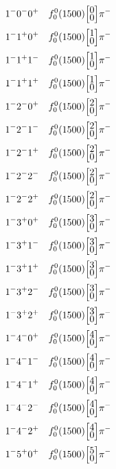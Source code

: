 \documentclass[10pt,a4paper]{article}
\def\dst{\displaystyle}
\def\vsp{\hbox{\vrule height12.5pt depth3.5pt width0pt}}
\def\ells#1#2{\Big[\hskip-5pt\vsp\begin{array}{c}\dst#1\\[-4pt]\dst#2\end{array}\vsp\hskip-5pt\Big]}
\begin{document}
\begin{align*} 
 \begin{aligned}
1^{-}0^{-}0^{+}\quad & f_0^0(1500)\ells{0}{0}\pi^-\\
1^{-}1^{+}0^{+}\quad & f_0^0(1500)\ells{1}{0}\pi^-\\
1^{-}1^{+}1^{-}\quad & f_0^0(1500)\ells{1}{0}\pi^-\\
1^{-}1^{+}1^{+}\quad & f_0^0(1500)\ells{1}{0}\pi^-\\
1^{-}2^{-}0^{+}\quad & f_0^0(1500)\ells{2}{0}\pi^-\\
1^{-}2^{-}1^{-}\quad & f_0^0(1500)\ells{2}{0}\pi^-\\
1^{-}2^{-}1^{+}\quad & f_0^0(1500)\ells{2}{0}\pi^-\\
1^{-}2^{-}2^{-}\quad & f_0^0(1500)\ells{2}{0}\pi^-\\
1^{-}2^{-}2^{+}\quad & f_0^0(1500)\ells{2}{0}\pi^-\\
1^{-}3^{+}0^{+}\quad & f_0^0(1500)\ells{3}{0}\pi^-\\
1^{-}3^{+}1^{-}\quad & f_0^0(1500)\ells{3}{0}\pi^-\\
1^{-}3^{+}1^{+}\quad & f_0^0(1500)\ells{3}{0}\pi^-\\
1^{-}3^{+}2^{-}\quad & f_0^0(1500)\ells{3}{0}\pi^-\\
1^{-}3^{+}2^{+}\quad & f_0^0(1500)\ells{3}{0}\pi^-\\
1^{-}4^{-}0^{+}\quad & f_0^0(1500)\ells{4}{0}\pi^-\\
1^{-}4^{-}1^{-}\quad & f_0^0(1500)\ells{4}{0}\pi^-\\
1^{-}4^{-}1^{+}\quad & f_0^0(1500)\ells{4}{0}\pi^-\\
1^{-}4^{-}2^{-}\quad & f_0^0(1500)\ells{4}{0}\pi^-\\
1^{-}4^{-}2^{+}\quad & f_0^0(1500)\ells{4}{0}\pi^-\\
1^{-}5^{+}0^{+}\quad & f_0^0(1500)\ells{5}{0}\pi^-\\
\end{aligned} 
 \end{align*}\pagebreak
\end{document}

